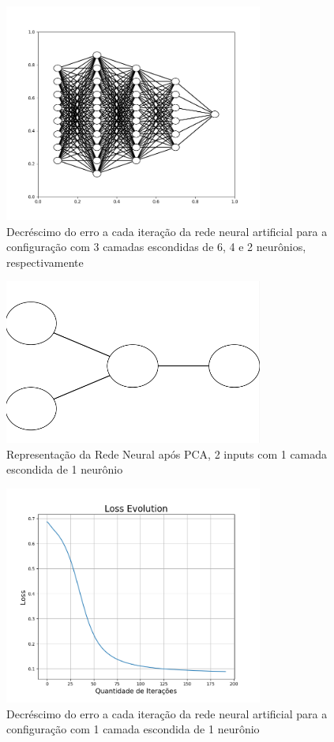 \documentclass{article}
\begin{document}
\begin{figure}[ht]
\centering
\includegraphics[width=8.5cm]{rna_10_8_6_loss}
\caption{Decréscimo do erro a cada iteração da rede neural artificial para a configuração com 3 camadas escondidas de 6, 4 e 2 neurônios, respectivamente}
\label{rna_10_8_6_loss}
\end{figure}

\begin{figure}[ht]
\centering
\includegraphics[width=8.5cm]{rna_pca_1}
\caption{Representação da Rede Neural após PCA, 2 inputs com 1 camada escondida de 1 neurônio}
\label{rna_pca_1}
\end{figure}

\begin{figure}[ht]
\centering
\includegraphics[width=8.5cm]{rna_pca_1_loss}
\caption{Decréscimo do erro a cada iteração da rede neural artificial para a configuração com 1 camada escondida de 1 neurônio}
\label{rna_pca_1_loss}
\end{figure}
\end{document}
